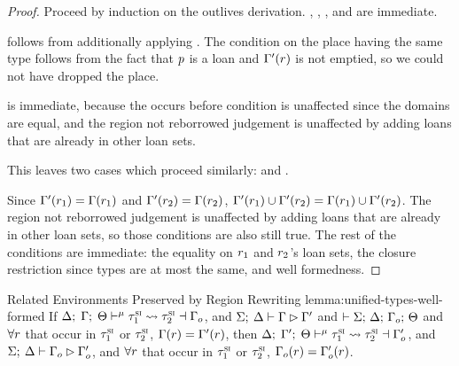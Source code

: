 \begin{proof}
  Proceed by induction on the outlives derivation. ,
  , , and 
  are immediate.

   follows from additionally applying
  . The condition on the place having the same
  type follows from the fact that $p$ is a loan and
  $\Gamma^\prime(r)$ is not emptied, so we could not have dropped the
  place.

   is immediate, because the occurs before condition is
  unaffected since the domains are equal, and the region not reborrowed
  judgement is unaffected by adding loans that are already in other loan sets.

  This leaves two cases which proceed similarly:  and
  .
  
  \vspace{1em}
  \noindent \framebox[\textwidth]{ \figuresize
    \begin{mathpar}
      \UCombineLocalProvs
    \end{mathpar}
  } \vspace{1em}

  Since $\Gamma^\prime(r_1) = \Gamma(r_1)$ and
  $\Gamma^\prime(r_2) = \Gamma(r_2)$,
  $\Gamma^\prime(r_1) \cup \Gamma^\prime(r_2) =
  \Gamma(r_1) \cup \Gamma^\prime(r_2)$. The region not
  reborrowed judgement is unaffected by adding loans that are already in other
  loan sets, so those conditions are also still true. The rest of the conditions
  are immediate: the equality on $r_1$ and $r_2$'s loan sets, the
  closure restriction since types are at most the same, and well formedness.
\end{proof}

\begin{oxlemma}{Related Environments Preserved by Region Rewriting}
  {lemma:unified-types-well-formed} If
  $\Delta; \; \Gamma; \; \Theta \vdash^{\mu} \tau^\textsc{si}_1 \leadsto \tau^\textsc{si}_2 \dashv \Gamma_o$, and
  $\Sigma; \: \Delta \vdash \Gamma \rhd \Gamma^\prime$ and
  $\vdash \Sigma; \, \Delta; \, \Gamma_o; \, \Theta$ and $\forall
  r$ that occur in $\tau^\textsc{si}_1$ or $\tau^\textsc{si}_2$, $\Gamma(r) =
  \Gamma^\prime(r)$, then
  $\Delta; \; \Gamma^\prime; \; \Theta \vdash^{\mu} \tau^\textsc{si}_1 \leadsto \tau^\textsc{si}_2 \dashv \Gamma_o^\prime$,
  and
  $\Sigma; \: \Delta \vdash \Gamma_o \rhd \Gamma_o^\prime$,
  and $\forall r$ that occur in $\tau^\textsc{si}_1$ or $\tau^\textsc{si}_2$,
  $\Gamma_o(r) = \Gamma_o^\prime(r)$.
\end{oxlemma}

